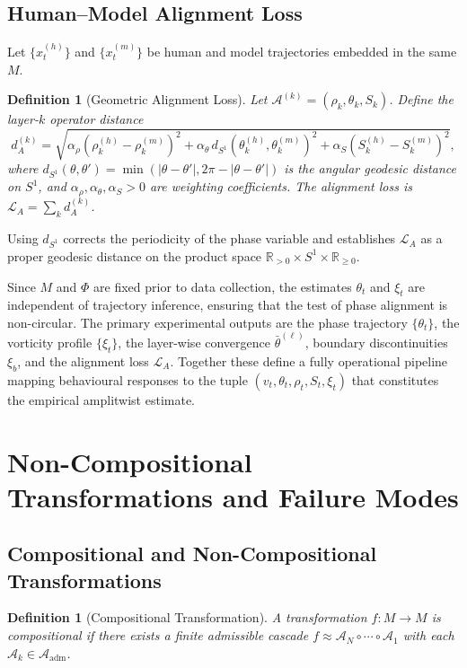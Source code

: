 \documentclass[12pt, a4paper]{article}
\newtheorem{definition}[theorem]{Definition}
\theoremstyle{remark}
\theoremstyle{definition}
\begin{document}
\subsection{Human--Model Alignment Loss}

Let $\{x_t^{(h)}\}$ and $\{x_t^{(m)}\}$ be human and model trajectories embedded in
the same $M$.

\begin{definition}[Geometric Alignment Loss]
Let $\mathcal{A}^{(k)} = (\rho_k, \theta_k, S_k)$.  Define the layer-$k$ operator distance
\[
d_A^{(k)} = \sqrt{
\alpha_\rho(\rho_k^{(h)} - \rho_k^{(m)})^2
+ \alpha_\theta\, d_{S^1}(\theta_k^{(h)}, \theta_k^{(m)})^2
+ \alpha_S(S_k^{(h)} - S_k^{(m)})^2
},
\]
where $d_{S^1}(\theta, \theta') = \min(|\theta-\theta'|, 2\pi - |\theta-\theta'|)$ is the
angular geodesic distance on $S^1$, and $\alpha_\rho, \alpha_\theta, \alpha_S > 0$ are
weighting coefficients.  The alignment loss is $\mathcal{L}_A = \sum_k d_A^{(k)}$.
\end{definition}

Using $d_{S^1}$ corrects the periodicity of the phase variable and establishes
$\mathcal{L}_A$ as a proper geodesic distance on the product space
$\mathbb{R}_{>0} \times S^1 \times \mathbb{R}_{\ge 0}$.

Since $M$ and $\Phi$ are fixed prior to data collection, the estimates $\theta_t$ and
$\xi_t$ are independent of trajectory inference, ensuring that the test of phase alignment
is non-circular.  The primary experimental outputs are the phase trajectory $\{\theta_t\}$,
the vorticity profile $\{\xi_t\}$, the layer-wise convergence $\bar\theta^{(\ell)}$,
boundary discontinuities $\xi_b$, and the alignment loss $\mathcal{L}_A$.  Together these
define a fully operational pipeline mapping behavioural responses to the tuple
$(v_t, \theta_t, \rho_t, S_t, \xi_t)$ that constitutes the empirical amplitwist estimate.

\section{Non-Compositional Transformations and Failure Modes}
\label{app:failure}

\subsection{Compositional and Non-Compositional Transformations}

\begin{definition}[Compositional Transformation]
A transformation $f\colon M \to M$ is compositional if there exists a finite admissible
cascade $f \approx \mathcal{A}_N \circ \cdots \circ \mathcal{A}_1$ with each
$\mathcal{A}_k \in \mathcal{A}_{\mathrm{adm}}$.
\end{definition}
\end{document}
